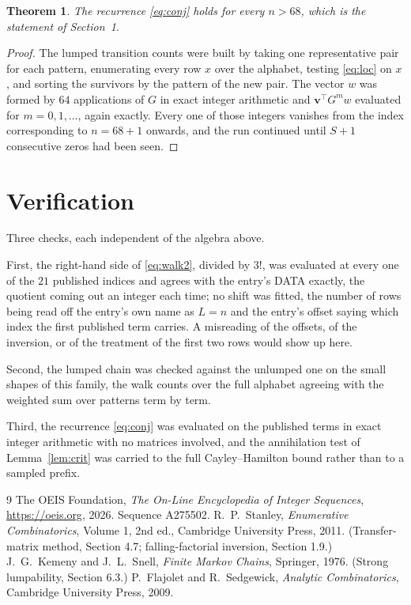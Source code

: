 \documentclass[11pt,a4paper]{article}
\theoremstyle{plain}
\newtheorem{theorem}{Theorem}
\theoremstyle{definition}
\begin{document}
\begin{theorem}
The recurrence \eqref{eq:conj} holds for every $n>68$, which is the statement of
Section~1.
\end{theorem}

\begin{proof}
The lumped transition counts were built by taking one representative pair for each pattern,
enumerating every row $x$ over the alphabet, testing \eqref{eq:loc} on $x$, and sorting
the survivors by the pattern of the new pair. The vector $w$ was formed by $64$
applications of $G$ in exact integer arithmetic and $\mathbf{v}^{\!\top}G^{m}w$
evaluated for $m=0,1,\dots$, again exactly. Every one of those integers vanishes from the
index corresponding to $n=68+1$ onwards, and the run continued until $S+1$ consecutive
zeros had been seen.
\end{proof}

\section{Verification}

Three checks, each independent of the algebra above.

First, the right-hand side of \eqref{eq:walk2}, divided by $3!$, was evaluated at every
one of the $21$ published indices and agrees with the entry's DATA exactly, the quotient
coming out an integer each time; no shift was fitted, the number of rows being read off the
entry's own name as $L=n$ and the entry's offset saying which index the first published
term carries. A misreading of the offsets, of the inversion, or of the treatment of the first
two rows would show up here.

Second, the lumped chain was checked against the unlumped one on the small shapes of this
family, the walk counts over the full alphabet agreeing with the weighted sum over patterns
term by term.

Third, the recurrence \eqref{eq:conj} was evaluated on the published terms in exact integer
arithmetic with no matrices involved, and the annihilation test of Lemma~\ref{lem:crit} was
carried to the full Cayley--Hamilton bound rather than to a sampled prefix.

\begin{thebibliography}{9}
 The OEIS Foundation, \emph{The On-Line Encyclopedia of Integer
Sequences}, \url{https://oeis.org}, 2026. Sequence A275502.
 R.~P.~Stanley, \emph{Enumerative Combinatorics}, Volume 1, 2nd ed.,
Cambridge University Press, 2011. (Transfer-matrix method, Section 4.7; falling-factorial
inversion, Section 1.9.)
 J.~G.~Kemeny and J.~L.~Snell, \emph{Finite Markov Chains}, Springer,
1976. (Strong lumpability, Section 6.3.)
 P.~Flajolet and R.~Sedgewick, \emph{Analytic Combinatorics}, Cambridge
University Press, 2009.
\end{thebibliography}
\end{document}
